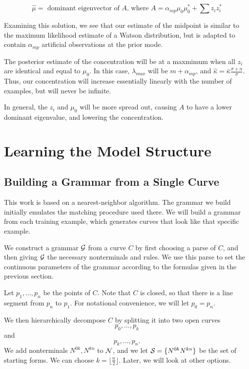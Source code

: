 \documentclass{article}
\begin{document}
$$
\widehat{\mu} = \mbox{ dominant eigenvector of }
A\mbox{, where } A = \alpha_{mp} \mu_0 \mu_0^* + \sum z_i z_i^*
$$

Examining this solution, we see that our estimate of the
midpoint is similar to the maximum likelihood estimate of
a Watson distribution, but is adapted to contain
$\alpha_{mp}$ artificial observations at the prior mode.

The posterior estimate of the concentration will be at
a maxmimum when all $z_i$ are identical and equal to 
$\mu_0$. In this case, $\lambda_{max}$ will be
$m + \alpha_{mp}$, and $\widehat{\kappa} = 
\bar{\kappa} \frac{\sigma+n}{\sigma}$. Thus, our concentration will
increase essentially linearly with the number of examples, but will never
be infinite.

In general, the $z_i$ and $\mu_0$ will be more spread out, causing $A$
to have a lower dominant eigenvalue, and lowering the concentration.

\section{Learning the Model Structure}

\subsection{Building a Grammar from a Single Curve}
 
This work is based on a nearest-neighbor algorithm. The grammar we
build initially emulates the matching procedure used there. We will
build a grammar from each training example, which generates curves
that look like that specific example.

We construct a grammar ${\mathcal G}$ from a curve $C$ by first choosing a
parse of $C$, and then giving ${\mathcal G}$ the necessary nonterminals and
rules. We use this parse to set the continuous parameters of the
grammar according to the formulas given in the previous section.

Let $p_1,\dots,p_n$ be the points of $C$. Note that $C$ is closed, so
that there is a line segment from $p_n$ to $p_1$. For notational
convenience, we will let $p_0 = p_n$.

We then hierarchically decompose $C$ by splitting it into two open
curves
$$p_0,\dots,p_k$$
and
$$p_k, \dots, p_n.$$ 
We add nonterminals $N^{0k}, N^{kn}$ to ${\mathcal N}$, and we let ${\mathcal S} = \{
N^{0k} N^{kn} \}$ be the set of starting forms.  We can choose
$k=\lfloor \frac{n}{2} \rfloor$. Later, we will look at other options.
\end{document}
